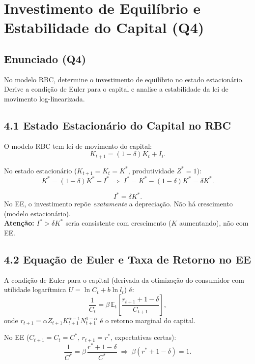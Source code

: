 \documentclass[12pt, a4paper]{article}
\newcommand{\E}{\mathbb{E}}
\begin{document}
\section{Investimento de Equilíbrio e Estabilidade do Capital (Q4)}

\subsection*{Enunciado (Q4)}

No modelo RBC, determine o investimento de equilíbrio no estado estacionário. Derive a condição de Euler para o capital e analise a estabilidade da lei de movimento log-linearizada.

\subsection*{4.1 Estado Estacionário do Capital no RBC}

O modelo RBC tem lei de movimento do capital:
\[
K_{t+1} = (1-\delta)K_t + I_t.
\]

No estado estacionário ($K_{t+1} = K_t = K^*$, produtividade $Z^* = 1$):
\[
K^* = (1-\delta)K^* + I^* \;\Longrightarrow\; I^* = K^* - (1-\delta)K^* = \delta K^*.
\]

\begin{resultbox}[title={Investimento de Equilíbrio no RBC}]
\[
I^* = \delta K^*.
\]
No EE, o investimento repõe \emph{exatamente} a depreciação. Não há crescimento (modelo estacionário).\\
\textbf{Atenção:} $I^* > \delta K^*$ seria consistente com crescimento ($K$ aumentando), não com EE.
\end{resultbox}

\subsection*{4.2 Equação de Euler e Taxa de Retorno no EE}

A condição de Euler para o capital (derivada da otimização do consumidor com utilidade logarítmica $U = \ln C_t + b\ln l_t$) é:
\[
\frac{1}{C_t} = \beta\,\E_t\!\left[\frac{r_{t+1} + 1 - \delta}{C_{t+1}}\right],
\]
onde $r_{t+1} = \alpha Z_{t+1}K_{t+1}^{\alpha-1}N_{t+1}^{1-\alpha}$ é o retorno marginal do capital.

No EE ($C_{t+1} = C_t = C^*$, $r_{t+1} = r^*$, expectativas certas):
\[
\frac{1}{C^*} = \beta\,\frac{r^* + 1 - \delta}{C^*} \;\Longrightarrow\; \beta(r^* + 1 - \delta) = 1.
\]
\end{document}
